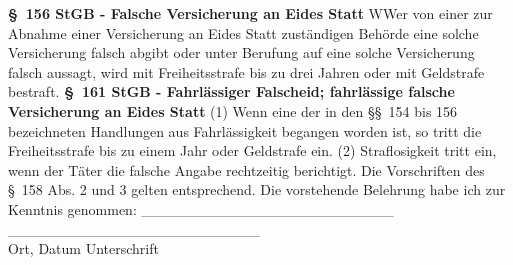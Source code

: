 \newline
\textbf{\S\ 156 StGB - Falsche Versicherung an Eides Statt}\newline
WWer von einer zur Abnahme einer Versicherung an Eides Statt zuständigen Behörde eine solche Versicherung falsch abgibt oder unter Berufung auf eine solche Versicherung falsch aussagt, wird mit Freiheitsstrafe bis zu drei Jahren oder mit Geldstrafe bestraft.\newline
\textbf{\S\ 161 StGB - Fahrlässiger Falscheid; fahrlässige falsche Versicherung an Eides Statt}
(1) Wenn eine der in den \S\S\ 154 bis 156 bezeichneten Handlungen aus Fahrlässigkeit begangen worden ist, so tritt die Freiheitsstrafe bis zu einem Jahr oder Geldstrafe ein.
(2) Straflosigkeit tritt ein, wenn der Täter die falsche Angabe rechtzeitig berichtigt. Die Vorschriften des \S\ 158 Abs. 2 und 3 gelten entsprechend.\newline
\newline
Die vorstehende Belehrung habe ich zur Kenntnis genommen:\newline
\newline
\_\_\_\_\_\_\_\_\_\_\_\_\_\_\_\_\_\_\_\_\_\_\_\_ \hspace{1.5cm} \_\_\_\_\_\_\_\_\_\_\_\_\_\_\_\_\_\_\_\_\_\_\_\_ \\
\small{Ort, Datum}\hspace{6.2cm}
\small{Unterschrift}
